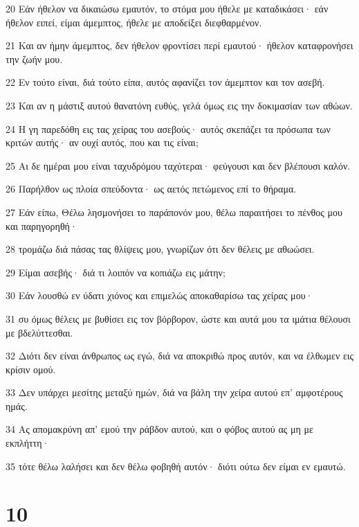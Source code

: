 \par 20 Εάν ήθελον να δικαιώσω εμαυτόν, το στόμα μου ήθελε με καταδικάσει· εάν ήθελον ειπεί, είμαι άμεμπτος, ήθελε με αποδείξει διεφθαρμένον.
\par 21 Και αν ήμην άμεμπτος, δεν ήθελον φροντίσει περί εμαυτού· ήθελον καταφρονήσει την ζωήν μου.
\par 22 Εν τούτο είναι, διά τούτο είπα, αυτός αφανίζει τον άμεμπτον και τον ασεβή.
\par 23 Και αν η μάστιξ αυτού θανατόνη ευθύς, γελά όμως εις την δοκιμασίαν των αθώων.
\par 24 Η γη παρεδόθη εις τας χείρας του ασεβούς· αυτός σκεπάζει τα πρόσωπα των κριτών αυτής· αν ουχί αυτός, που και τις είναι;
\par 25 Αι δε ημέραι μου είναι ταχυδρόμου ταχύτεραι· φεύγουσι και δεν βλέπουσι καλόν.
\par 26 Παρήλθον ως πλοία σπεύδοντα· ως αετός πετώμενος επί το θήραμα.
\par 27 Εάν είπω, Θέλω λησμονήσει το παράπονόν μου, θέλω παραιτήσει το πένθος μου και παρηγορηθή·
\par 28 τρομάζω διά πάσας τας θλίψεις μου, γνωρίζων ότι δεν θέλεις με αθωώσει.
\par 29 Είμαι ασεβής· διά τι λοιπόν να κοπιάζω εις μάτην;
\par 30 Εάν λουσθώ εν ύδατι χιόνος και επιμελώς αποκαθαρίσω τας χείρας μου·
\par 31 συ όμως θέλεις με βυθίσει εις τον βόρβορον, ώστε και αυτά μου τα ιμάτια θέλουσι με βδελύττεσθαι.
\par 32 Διότι δεν είναι άνθρωπος ως εγώ, διά να αποκριθώ προς αυτόν, και να έλθωμεν εις κρίσιν ομού.
\par 33 Δεν υπάρχει μεσίτης μεταξύ ημών, διά να βάλη την χείρα αυτού επ' αμφοτέρους ημάς.
\par 34 Ας απομακρύνη απ' εμού την ράβδον αυτού, και ο φόβος αυτού ας μη με εκπλήττη·
\par 35 τότε θέλω λαλήσει και δεν θέλω φοβηθή αυτόν· διότι ούτω δεν είμαι εν εμαυτώ.

\chapter{10}

